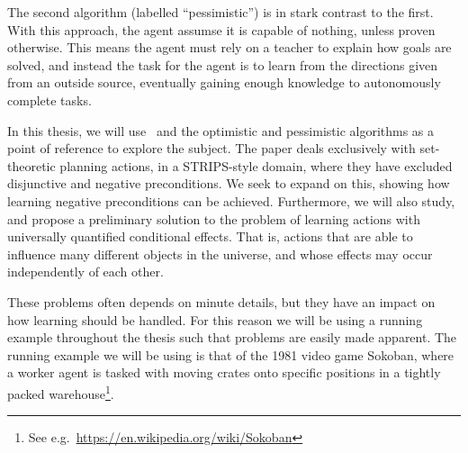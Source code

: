 \documentclass[Master.tex]{subfiles}
\begin{document}
	The second algorithm (labelled ``pessimistic'') is in stark contrast to the first. With this approach, the agent assumse it is capable of nothing, unless proven otherwise. This means the agent must rely on a teacher to explain how goals are solved, and instead the task for the agent is to learn from the directions given from an outside source, eventually gaining enough knowledge to autonomously complete tasks.
	
    In this thesis, we will use~\cite{Walsh2008} and the optimistic and pessimistic algorithms as a point of reference to explore the subject. The paper deals exclusively with set-theoretic planning actions, in a STRIPS-style domain, where they have excluded disjunctive and negative preconditions. 
	We seek to expand on this, showing how learning negative preconditions can be achieved. Furthermore, we will also study, and propose a preliminary solution to the problem of learning actions with universally quantified conditional effects. That is, actions that are able to influence many different objects in the universe, and whose effects may occur independently of each other.
	
    These problems often depends on minute details, but they have an impact on how learning should be handled. For this reason we will be using a running example throughout the thesis such that problems are easily made apparent. The running example we will be using is that of the 1981 video game Sokoban, where a worker agent is tasked with moving crates onto specific positions in a tightly packed warehouse\footnote{See e.g.\ \url{https://en.wikipedia.org/wiki/Sokoban}}.
	
\end{document}
